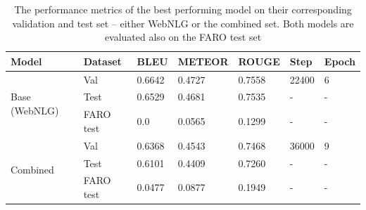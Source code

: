 \documentclass[
hf, %
]{ceurart}
\begin{document}
\begin{table}[ht]
\caption{The performance metrics of the best performing model on their corresponding validation and test set -- either WebNLG or the combined set. Both models are evaluated also on the FARO test set}
\centering
\begin{tabular}{|l|l|l|l|l|l|l|}
\hline
\textbf{Model}                 & \textbf{Dataset} & \textbf{BLEU} & \textbf{METEOR} & \textbf{ROUGE} & \textbf{Step} & \textbf{Epoch} \\ \hline
\multirow{3}{*}{Base (WebNLG)} & Val              & 0.6642        & 0.4727          & 0.7558         & 22400         & 6              \\ \cline{2-7} 
                               & Test             & 0.6529        & 0.4681          & 0.7535         & -             & -              \\ \cline{2-7} 
                               & FARO test        & 0.0           & 0.0565           & 0.1299         & -             & -              \\ \hline
\multirow{3}{*}{Combined}      & Val              & 0.6368        & 0.4543          & 0.7468         & 36000         & 9              \\ \cline{2-7} 
                               & Test             & 0.6101        & 0.4409          & 0.7260         & -             & -              \\ \cline{2-7} 
                               & FARO test        & 0.0477        & 0.0877          & 0.1949         & -             & -              \\ \hline
\end{tabular}

\label{tab:training_jointgt}
\end{table}
\end{document}
